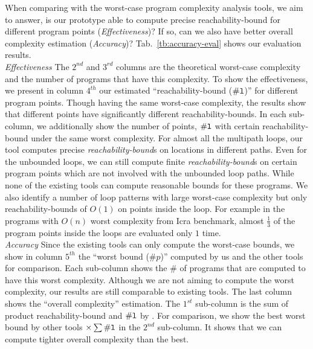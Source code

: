 When comparing with the worst-case program
complexity analysis tools, we aim to answer, is our prototype able to compute precise reachability-bound for different program points (\emph{Effectiveness})? If so, can we also have better overall complexity estimation (\emph{Accuracy})?
Tab.~\ref{tb:accuracy-eval} shows our evaluation results.
\\
\emph{Effectiveness}
\newcommand{\pointnum}{\kw{\# l}}
The $2^{nd}$ and $3^{rd}$ columns are the theoretical worst-case complexity and the number of programs that have this complexity.
To show the effectiveness, 
we present in column $4^{th}$ our estimated ``{reachability-bound ($\pointnum$)}'' for different program points. 
Though having the same worst-case complexity, the results show that different points have significantly different reachability-bounds.
In each sub-column, we additionally show the number of points, $\pointnum$ with certain reachability-bound under the same worst complexity.
For almost all the multipath loops, our tool computes precise \emph{reachability-bound}s on locations in different paths.
Even for the unbounded loops, we can still compute finite \emph{reachability-bound}s on certain program points which are not involved with the unbounded loop paths.
While none of the existing tools can compute reasonable bounds for these programs.
We also identify a number of loop patterns with large worst-case complexity but only reachability-bounds of $O(1)$ on points inside the loop.
For example in the programs  with $O(n)$ worst complexity from Icra benchmark,
almost $\frac{1}{3}$ of the program points inside the loops are evaluated only $1$ time.
\\
\emph{Accuracy} Since the existing tools can only compute the worst-case bounds,
we show in column $5^{th}$ the ``worst bound ($\# p$)'' computed by us and the other tools for comparison. Each sub-column shows the $\#$ of programs that are computed to have this worst complexity.
Although we are not aiming to compute the worst complexity, our results are still comparable to existing tools.
The last column shows the ``overall complexity'' estimation.
The $1^{st}$ sub-column is the sum of product reachability-bound and $\pointnum$ by {\THESYSTEM}.
For comparison, we show the best worst bound by other tools $\times \sum\pointnum$ in the $2^{nd}$ sub-column. It shows that we can compute tighter overall complexity than the best.
